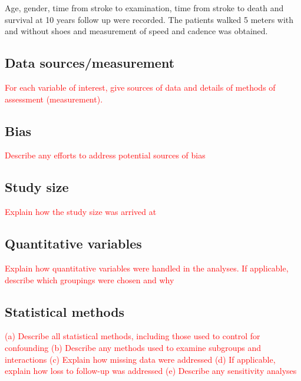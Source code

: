 \documentclass[a4paper,12pt]{article}
\begin{document}
Age, gender, time from stroke to examination, time from stroke to death and survival at 10 years follow up were recorded. The patients walked 5 meters with and without shoes and measurement of speed and cadence was obtained. 
\subsection{Data sources/measurement} \textcolor{red}{For each variable of interest, give sources of data and details of methods of assessment (measurement).}
\subsection{Bias} \textcolor{red}{Describe any efforts to address potential sources of bias}
\subsection{Study size} \textcolor{red}{ Explain how the study size was arrived at}
\subsection{Quantitative variables}\textcolor{red}{ Explain how quantitative variables were handled in the analyses. If applicable, describe which groupings were chosen and why}

\subsection{Statistical methods}\textcolor{red}{
(a) Describe all statistical methods, including those used to control for confounding
(b) Describe any methods used to examine subgroups and interactions
(c) Explain how missing data were addressed
(d) If applicable, explain how loss to follow-up was addressed
(e) Describe any sensitivity analyses}
\end{document}
